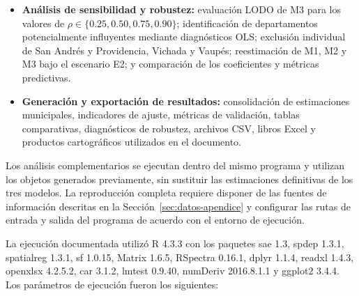 \begin{itemize}
    \item \textbf{Análisis de sensibilidad y robustez:} evaluación LODO de M3 para los valores de $\rho\in\{0.25,0.50,0.75,0.90\}$; identificación de departamentos potencialmente influyentes mediante diagnósticos OLS; exclusión individual de San Andrés y Providencia, Vichada y Vaupés; reestimación de M1, M2 y M3 bajo el escenario E2; y comparación de los coeficientes y métricas predictivas.

    \item \textbf{Generación y exportación de resultados:} consolidación de estimaciones municipales, indicadores de ajuste, métricas de validación, tablas comparativas, diagnósticos de robustez, archivos CSV, libros Excel y productos cartográficos utilizados en el documento.

\end{itemize}

Los análisis complementarios se ejecutan dentro del mismo programa y utilizan los objetos generados previamente, sin sustituir las estimaciones definitivas de los tres modelos. La reproducción completa requiere disponer de las fuentes de información descritas en la Sección~\ref{sec:datos-apendice} y configurar las rutas de entrada y salida del programa de acuerdo con el entorno de ejecución.


La ejecución documentada utilizó R 4.3.3 con los paquetes sae 1.3, spdep 1.3.1, spatialreg 1.3.1, sf 1.0.15, Matrix 1.6.5, RSpectra 0.16.1, dplyr 1.1.4, readxl 1.4.3, openxlsx 4.2.5.2, car 3.1.2, lmtest 0.9.40, numDeriv 2016.8.1.1 y ggplot2 3.4.4. Los parámetros de ejecución fueron los siguientes:

